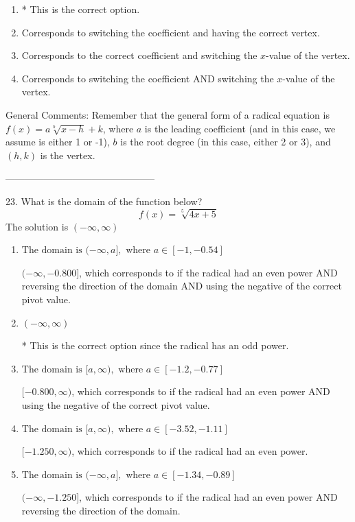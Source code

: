 \documentclass{extbook}[14pt]
\begin{document}
\begin{enumerate}[label=\Alph*.] 
\item * This is the correct option.  
\item Corresponds to switching the coefficient and having the correct vertex.  
\item Corresponds to the correct coefficient and switching the $x$-value of the vertex.  
\item Corresponds to switching the coefficient AND switching the $x$-value of the vertex.  
\end{enumerate} 
 
General Comments: Remember that the general form of a radical equation is $ f(x) = a \sqrt[b]{x - h} + k $, where $a$ is the leading coefficient (and in this case, we assume is either 1 or -1), $b$ is the root degree (in this case, either 2 or 3), and $(h, k)$ is the vertex.

-----------------------------------------------

23. What is the domain of the function below?
\[ f(x) = \sqrt[5]{4 x + 5} \] 
The solution is $ (-\infty, \infty) $ 

\begin{enumerate}[label=\Alph*.] 
\item $ \text{The domain is } (-\infty, a], \text{   where } a \in [-1, -0.54] $ 

 $(-\infty, -0.800]$, which corresponds to if the radical had an even power AND reversing the direction of the domain AND using the negative of the correct pivot value. 
\item $ (-\infty, \infty) $ 

 * This is the correct option since the radical has an odd power. 
\item $ \text{The domain is } [a, \infty), \text{   where } a \in [-1.2, -0.77] $ 

 $[-0.800, \infty)$, which corresponds to if the radical had an even power AND using the negative of the correct pivot value. 
\item $ \text{The domain is } [a, \infty), \text{   where } a \in [-3.52, -1.11] $ 

 $[-1.250, \infty)$, which corresponds to if the radical had an even power. 
\item $ \text{The domain is } (-\infty, a], \text{   where } a \in [-1.34, -0.89] $ 

 $(-\infty, -1.250]$, which corresponds to if the radical had an even power AND reversing the direction of the domain. 
\end{enumerate} 
 
\end{document}
